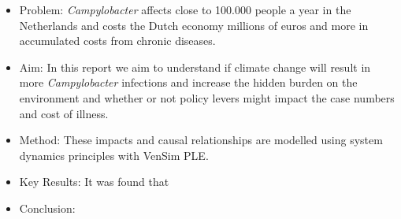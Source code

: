 \begin{itemize}
    \item Problem: \textit{Campylobacter} affects close to 100.000 people a year in the Netherlands and costs the Dutch economy millions of euros and more in accumulated costs from chronic diseases. 
    \item Aim: In this report we aim to understand if climate change will result in more \textit{Campylobacter} infections and increase the hidden burden on the environment and whether or not policy levers might impact the case numbers and cost of illness. 
    \item Method: These impacts and causal relationships are modelled using system dynamics principles with VenSim PLE. 
    \item Key Results: It was found that 
    \item Conclusion: 
\end{itemize}